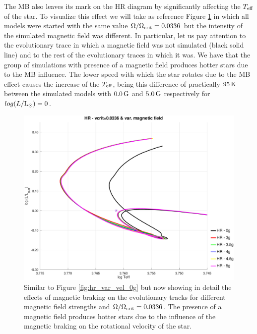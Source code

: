 \documentclass[fleqn,usenatbib]{mnras}
\begin{document}
The MB also leaves its mark on the HR diagram by significantly affecting the $T_{\mathrm{eff}}$ of the star. To visualize this effect we will take as reference Figure \ref{hr_vc_0336_var_g_z1} in which all models were started with the same value $\Omega / \Omega_{\mathrm{crit}}=0.0336$ but the intensity of the simulated magnetic field was different. In particular, let us pay attention to the evolutionary trace in which a magnetic field was not simulated (black solid line) and to the rest of the evolutionary traces in which it was. We have that the group of simulations with presence of a magnetic field produces hotter stars due to the MB influence. The lower speed with which the star rotates due to the MB effect causes the increase of the $T_{\mathrm{eff}}$, being this difference of practically $95\,\mathrm{K}$ between the simulated models with $0.0\,\mathrm{G}$ and $5.0\,\mathrm{G}$ respectively for $log(L/\mathrm{L}_\odot)=0$.

\begin{figure}
	\includegraphics[trim = 30mm 15mm 15mm 15mm, clip,width=\columnwidth]{figures/hr_vc_0336_var_g_z1.eps}
    \caption{Similar to Figure \ref{fig:hr_var_vel_0g} but now showing in detail the effects of magnetic braking on the evolutionary tracks for different magnetic field strengths and $\Omega / \Omega_{\mathrm{crit}}=0.0336$. The presence of a magnetic field produces hotter stars due to the influence of the magnetic braking on the rotational velocity of the star.}
    \label{hr_vc_0336_var_g_z1}
\end{figure}
\end{document}
